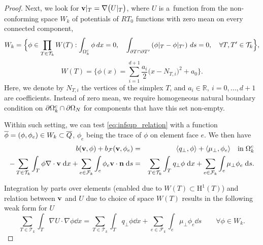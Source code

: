 {\begin{proof}
Next, we look for $\mathbf{v}|_T = \nabla \big(U|_T\big)$, where $U$ is a~function  
from the non-conforming space $W_k$ of potentials of $RT_{0}$ functions with 
zero mean on every connected component,
\begin{equation*}
  W_k =\Big\{\phi\in \prod_{T\in \mathcal{T}_k} W(T) : 
    \int_{\Omega^c_k} \phi \,dx =0,\quad
    \int_{\partial T \cap \partial T'} 
    \left( \phi|_{T} - \phi|_{T'}\right) \,ds = 0,\quad \forall 
T,T'\in\mathcal{T}_k\Big\}, 
\end{equation*}
\begin{equation*}
  W(T)=\Big\{\phi(x) = \sum_{i=1}^{d+1} 
    \frac{a_i}{2} \big(x - N_{T,i}\big)^2 + a_0\Big\}.  
\end{equation*}
Here, we denote by $N_{T,i}$ the vertices of the simplex $T$, and $a_i \in \mathbb{R},\ i = 0,\dots,d+1$ are coefficients. 
Instead of zero mean, we require homogeneous natural boundary condition on 
$\partial \Omega^c_k \cap \partial \Omega_{N}$ for components that have this 
set non-empty.

Within such setting, we can test \eqref{eq:infsup_relation} with a function 
$\overline\phi = (\phi, \phi_e) \in W_k \subset \overline Q$, $\phi_e$ being the trace of $\phi$ on element face $e$.
We then have
\begin{eqnarray}
    b(\mathbf{v}, \phi) + b_{\mathcal{F}}(\mathbf{v}, \phi_e) &=& \langle q_\bot, \phi \rangle 
        + \langle \mu_\bot, \phi_e \rangle  \quad \mathrm{in}\;\Omega^c_k \nonumber\\
    -\sum_{T\in\mathcal{T}_k} \int_T \phi \nabla\cdot \mathbf{v} \; \mathrm{d} x 
    + \sum_{e\in\mathcal{F}_k} \int_e \phi_e \mathbf{v} \cdot \mathbf{n} \; \mathrm{d} s &=&
    \sum_{T\in\mathcal{T}_k} \int_T q_\bot \phi \; \mathrm{d} x 
    + \sum_{e\in\mathcal{F}_k} \int_e \mu_\bot \phi_e \; \mathrm{d} s. \label{eq:infsup_weakform1}
\end{eqnarray}%

Integration by parts over elements (enabled due to $W(T)\subset\mathrm{H}^1(T)$) 
and relation between $\mathbf{v}$ and $U$ due to choice of space $W(T)$
results in the following weak form for $U$
\begin{equation} \label{eq:infsup_weakform2}
 \sum_{T\in \mathcal{T}_k} \int_{T} \nabla U \cdot \nabla \phi \dd x = 
\sum_{T\in \mathcal{T}_k} \int_{T} q_\bot \phi \dd x + 
\sum_{e\in \mathcal{F}_k} \int_{e} \mu_\bot \phi_e \dd s \qquad 
\forall \phi\in W_k. 
\end{equation}


\end{proof}}
